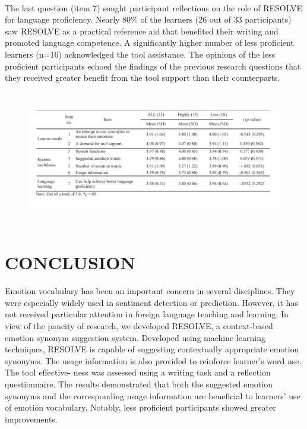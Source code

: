 \documentclass[a4paper,12pt,oneside]{article}
\begin{document}
\paragraph{}
The last question (item 7) sought participant reflections on the role of RESOLVE for language proficiency. Nearly 80\% of the learners (26 out of 33 participants) saw RESOLVE as a practical reference aid that benefited their writing and promoted language competence. A significantly higher number of less proficient learners (n=16) acknowledged the tool assistance. The opinions of the less proficient participants echoed the findings of the previous research questions that they received greater benefit from the tool support than their counterparts. 

\begin{figure}[H]
\includegraphics[height=5.9cm,width=15.4cm]{Table4.png}
\centering
\end{figure}

\newpage
\section{CONCLUSION}
\paragraph{}
Emotion vocabulary has been an important concern in several disciplines. They were especially widely used in sentiment detection or prediction. However, it has not received particular attention in foreign language teaching and learning. In view of the paucity of research, we developed RESOLVE, a context-based emotion synonym suggestion system. Developed using machine learning techniques, RESOLVE is capable of suggesting contextually appropriate emotion synonyms. The usage information is also provided to reinforce learner’s word use. The tool effective- ness was assessed using a writing task and a reflection questionnaire. The results demonstrated that both the suggested emotion synonyms and the corresponding usage information are beneficial to learners’ use of emotion vocabulary. Notably, less proficient participants showed greater improvements.
\end{document}
